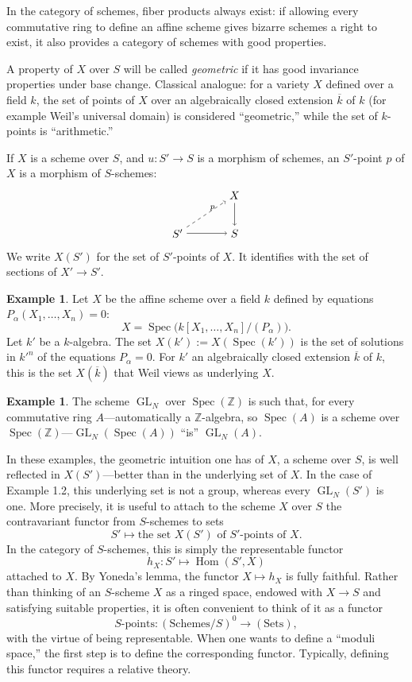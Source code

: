 \documentclass[11pt,a4paper]{article}
\theoremstyle{plain}
\theoremstyle{definition}
\newtheorem{example}[theorem]{Example}
\DeclareMathOperator{\Spec}{Spec}
\DeclareMathOperator{\Hom}{Hom}
\DeclareMathOperator{\GL}{GL}
\begin{document}
In the category of schemes, fiber products always exist: if allowing every commutative ring to define an affine scheme gives bizarre schemes a right to exist, it also provides a category of schemes with good properties.

A property of $X$ over $S$ will be called \emph{geometric} if it has good invariance properties under base change. Classical analogue: for a variety $X$ defined over a field $k$, the set of points of $X$ over an algebraically closed extension $\overline{k}$ of $k$ (for example Weil's universal domain) is considered ``geometric,'' while the set of $k$-points is ``arithmetic.''

If $X$ is a scheme over $S$, and $u:S'\to S$ is a morphism of schemes, an $S'$-point $p$ of $X$ is a morphism of $S$-schemes:
\[
\begin{tikzpicture}[baseline=-0.5ex,scale=1.2]
\node (X) at (1.5,1) {$X$};
\node (S') at (0,0) {$S'$};
\node (S) at (1.5,0) {$S$};
\draw[->] (X) -- (S);
\draw[->] (S') -- (S);
\draw[->,dashed] (S') -- (X) node[midway,above right] {$\scriptstyle p$};
\end{tikzpicture}
\]
We write $X(S')$ for the set of $S'$-points of $X$. It identifies with the set of sections of $X'\to S'$.

\begin{example}
Let $X$ be the affine scheme over a field $k$ defined by equations $P_\alpha(X_1,\ldots,X_n)=0$:
\[
X=\Spec\bigl(k[X_1,\ldots,X_n]/(P_\alpha)\bigr).
\]
Let $k'$ be a $k$-algebra. The set $X(k'):=X(\Spec(k'))$ is the set of solutions in $k'^n$ of the equations $P_\alpha=0$. For $k'$ an algebraically closed extension $\overline{k}$ of $k$, this is the set $X(\overline{k})$ that Weil views as underlying $X$.
\end{example}

\begin{example}
The scheme $\GL_N$ over $\Spec(\mathbb{Z})$ is such that, for every commutative ring $A$---automatically a $\mathbb{Z}$-algebra, so $\Spec(A)$ is a scheme over $\Spec(\mathbb{Z})$---$\GL_N(\Spec(A))$ ``is'' $\GL_N(A)$.
\end{example}

In these examples, the geometric intuition one has of $X$, a scheme over $S$, is well reflected in $X(S')$---better than in the underlying set of $X$. In the case of Example 1.2, this underlying set is not a group, whereas every $\GL_N(S')$ is one. More precisely, it is useful to attach to the scheme $X$ over $S$ the contravariant functor from $S$-schemes to sets
\[
S'\longmapsto \text{the set }X(S')\text{ of }S'\text{-points of }X.
\]
In the category of $S$-schemes, this is simply the representable functor
\[
h_X:S'\longmapsto\Hom(S',X)
\]
attached to $X$. By Yoneda's lemma, the functor $X\mapsto h_X$ is fully faithful. Rather than thinking of an $S$-scheme $X$ as a ringed space, endowed with $X\to S$ and satisfying suitable properties, it is often convenient to think of it as a functor
\[
S\text{-points}:(\text{Schemes}/S)^0\longrightarrow(\text{Sets}),
\]
with the virtue of being representable. When one wants to define a ``moduli space,'' the first step is to define the corresponding functor. Typically, defining this functor requires a relative theory.
\end{document}

